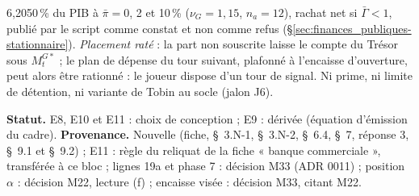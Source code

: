 \documentclass[11pt,a4paper]{article}
\begin{document}
\begin{proposee}
6,2050\,\% du PIB à $\bar\pi = 0$, 2 et 10\,\% ($\nu_G = 1{,}15$, $n_a = 12$), rachat net si $\bar\Gamma < 1$, publié par le script comme constat et non comme refus (\S\ref{sec:finances_publiques-stationnaire}). \emph{Placement raté} : la part non souscrite laisse le compte du Trésor sous $M^{G*}_t$ ; le plan de dépense du tour suivant, plafonné à l'encaisse d'ouverture, peut alors être rationné : le joueur dispose d'un tour de signal. Ni prime, ni limite de détention, ni variante de Tobin au socle (jalon J6).

\textbf{Statut.} E8, E10 et E11 : choix de conception ; E9 : dérivée (équation d'émission du cadre). \textbf{Provenance.} Nouvelle (fiche, \S~3.N-1, \S~3.N-2, \S~6.4, \S~7, réponse 3, \S~9.1 et \S~9.2) ; E11 : règle du reliquat de la fiche « banque commerciale », transférée à ce bloc ; lignes 19a et phase 7 : décision M33 (ADR 0011) ; position $\alpha$ : décision M22, lecture (f) ; encaisse visée : décision M33, citant M22.
\end{proposee}
\end{document}
